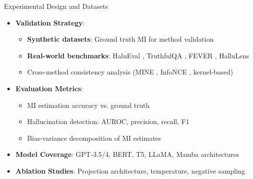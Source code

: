 \documentclass[aspectratio=169]{beamer}
\begin{document}
\begin{frame}{Experimental Design and Datasets}
\begin{itemize}
    \item \textbf{Validation Strategy}:
    \begin{itemize}
        \item \textbf{Synthetic datasets}: Ground truth MI for method validation
        \item \textbf{Real-world benchmarks}: HaluEval \citep{li2023halueval}, TruthfulQA \citep{lin2022truthfulqa}, FEVER \citep{thorne2018fever}, HalluLens \citep{bang2025hallulens}
        \item Cross-method consistency analysis (MINE \citep{belghazi2018mutual}, InfoNCE \citep{oord2018representation}, kernel-based)
    \end{itemize}
    \item \textbf{Evaluation Metrics}:
    \begin{itemize}
        \item MI estimation accuracy vs. ground truth
        \item Hallucination detection: AUROC, precision, recall, F1
        \item Bias-variance decomposition of MI estimates
    \end{itemize}
    \item \textbf{Model Coverage}: GPT-3.5/4, BERT, T5, LLaMA, Mamba architectures
    \item \textbf{Ablation Studies}: Projection architecture, temperature, negative sampling
\end{itemize}
\end{frame}
\end{document}
